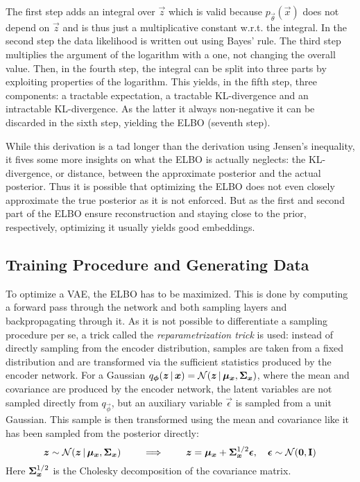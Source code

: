 					The first step adds an integral over \(\vec{z}\) which is valid because \( p_{\vec{\theta}}(\vec{x}) \) does not depend on \(\vec{z}\) and is thus just a multiplicative constant w.r.t. the integral. In the second step the data likelihood is written out using Bayes' rule. The third step multiplies the argument of the logarithm with a one, not changing the overall value. Then, in the fourth step, the integral can be split into three parts by exploiting properties of the logarithm. This yields, in the fifth step, three components: a tractable expectation, a tractable KL-divergence and an intractable KL-divergence. As the latter it always non-negative it can be discarded in the sixth step, yielding the ELBO (seventh step).

					While this derivation is a tad longer than the derivation using Jensen's inequality, it fives some more insights on what the ELBO is actually neglects: the KL-divergence, or distance, between the approximate posterior and the actual posterior. Thus it is possible that optimizing the ELBO does not even closely approximate the true posterior as it is not enforced. But as the first and second part of the ELBO ensure reconstruction and staying close to the prior, respectively, optimizing it usually yields good embeddings.

		\subsection{Training Procedure and Generating Data}
			To optimize a VAE, the ELBO has to be maximized. This is done by computing a forward pass through the network and both sampling layers and backpropagating through it. As it is not possible to differentiate a sampling procedure per se, a trick called the \emph{reparametrization trick} is used: instead of directly sampling from the encoder distribution, samples are taken from a fixed distribution and are transformed via the sufficient statistics produced by the encoder network. For a Gaussian \( q_{\bm{\phi}}(\bm{z} \,\vert\, \bm{x}) = \mathcal{N}(\bm{z} \,\vert\, \bm{\mu}_{\bm{x}}, \bm{\mathrm{\Sigma}}_{\bm{x}}) \), where the mean and covariance are produced by the encoder network, the latent variables are not sampled directly from \( q_{\vec{\phi}} \), but an auxiliary variable \( \vec{\epsilon} \) is sampled from a unit Gaussian. This sample is then transformed using the mean and covariance like it has been sampled from the posterior directly:
			\begin{equation}
				\bm{z} \sim \mathcal{N}(\bm{z} \,\vert\, \bm{\mu}_{\bm{x}}, \bm{\mathrm{\Sigma}}_{\bm{x}})
				\qquad\implies\qquad
				\bm{z} = \bm{\mu}_{\bm{x}} + \bm{\mathrm{\Sigma}}_{\bm{x}}^{1/2} \bm{\epsilon},\quad \bm{\epsilon} \sim \mathcal{N}(\bm{0}, \bm{\mathrm{I}})
			\end{equation}
			Here \( \bm{\mathrm{\Sigma}}_{\bm{x}}^{1/2} \) is the Cholesky decomposition of the covariance matrix.

